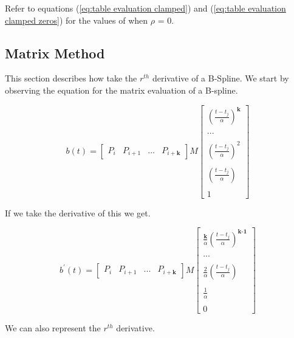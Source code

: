 \documentclass{article}
\begin{document}
Refer to equations (\ref{eq:table evaluation clamped}) and (\ref{eq:table evaluation clamped zeros}) for the values of  when \(\rho\) = 0.

\subsection{Matrix Method}

This section describes how take the \(r^{th}\) derivative of a B-Spline. We start by observing the equation for the matrix evaluation of a B-spline.

\begin{equation}
    b(t) = \begin{bmatrix} P_{i} & P_{i+1} & ... & P_{i+\textbf{k}}\end{bmatrix} M \begin{bmatrix} (\frac{t-t_j}{\alpha})^\textbf{k} \\ \\ ... \\ \\ (\frac{t-t_j}{\alpha})^2 \\ \\ (\frac{t-t_j}{\alpha}) \\ \\ 1 \end{bmatrix}
\end{equation}

If we take the derivative of this we get.

\begin{equation}
    b^{\prime}(t) = \begin{bmatrix} P_{i} & P_{i+1} & ... & P_{i+\textbf{k}}\end{bmatrix} M \begin{bmatrix} \frac{\textbf{k}}{\alpha} (\frac{t-t_j}{\alpha})^\textbf{k-1} \\ \\ ... \\ \\ \frac{2}{\alpha}(\frac{t-t_j}{\alpha}) \\ \\ \frac{1}{\alpha} \\ \\ 0 \end{bmatrix}
\end{equation}

We can also represent the \(r^{th}\) derivative.
\end{document}
